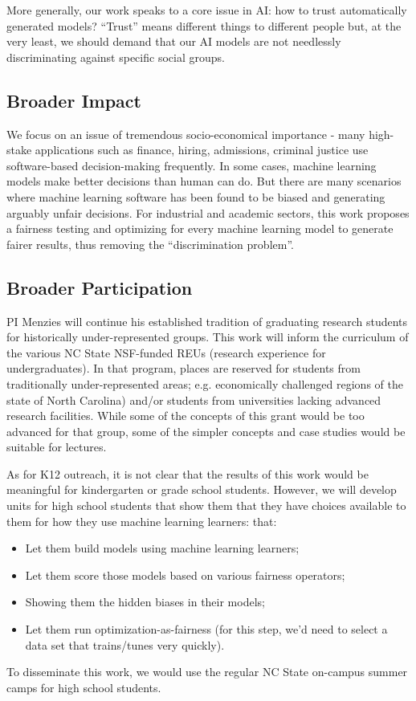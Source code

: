 \documentclass{NSF}
\newenvironment{myitemize}
{ \begin{itemize}[topsep=0pt,bottomsep=0pt,itemsep=0,leftmargin=*]
    \setlength{\itemsep}{0pt}
    \setlength{\parskip}{0pt}
    \setlength{\parsep}{0pt}     }
{ \end{itemize}                  }
\newcommand{\bi}{\begin{myitemize}}
\newcommand{\ei}{\end{myitemize}}
\begin{document}
\begin{nsfdescription}
More generally, our work speaks to a core issue in AI: how to trust automatically generated models? ``Trust'' means   different things to different people but, at the very least, we should demand that  our AI models are not needlessly discriminating against specific social groups.
 

\subsection{Broader Impact} 

We focus on an issue of tremendous socio-economical importance - many high-stake applications such as finance, hiring, admissions, criminal justice use software-based decision-making frequently. In some cases, machine learning models make better decisions than human can do. But there are many scenarios where machine learning software has been found to be biased and generating arguably unfair decisions. For industrial and academic sectors, this work proposes a fairness testing and optimizing for every machine learning model to generate fairer results, thus removing the ``discrimination problem''.

\subsection{Broader Participation} 

PI Menzies will continue his established tradition of graduating research students for historically under-represented groups. This work will inform the curriculum of the various NC State  NSF-funded REUs (research experience for undergraduates).
In that program, places are reserved for students from traditionally under-represented areas; e.g. economically challenged regions of the state of North Carolina) and/or students from universities lacking advanced research facilities. While some of the concepts of this grant would be too advanced for that group, some of the simpler concepts and case studies would be suitable for lectures.

As   for K12 outreach, it is not clear that the results
of this work would be meaningful for kindergarten or grade school students. However, we will develop units for high school students that show them that they have choices available to them for how they use machine learning learners:
that:
\bi
\item Let them build models using machine learning learners;
\item Let them score those models based on various fairness operators;
\item Showing them the hidden biases in their models;
\item Let them run optimization-as-fairness (for this step, we'd need to select a data
set that trains/tunes very quickly).
\ei
To disseminate this work, we would use the regular NC State    on-campus summer camps for high school students.


\end{nsfdescription}
\end{document}
